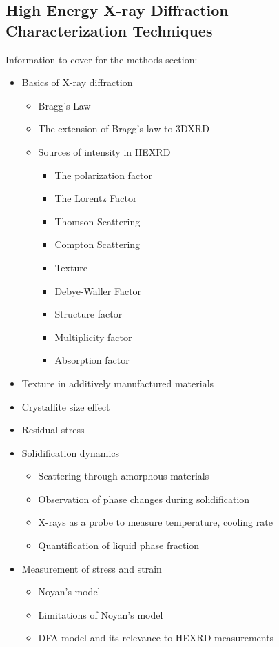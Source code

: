 \subsection{High Energy X-ray Diffraction Characterization Techniques}
Information to cover for the methods section:
\begin{itemize}
	\item Basics of X-ray diffraction \begin{itemize}
		\item Bragg's Law
		\item The extension of Bragg's law to 3DXRD
		\item Sources of intensity in HEXRD \begin{itemize}
			\item The polarization factor
			\item The Lorentz Factor
			\item Thomson Scattering
			\item Compton Scattering
			\item Texture
			\item Debye-Waller Factor
			\item Structure factor
			\item Multiplicity factor
			\item Absorption factor \end{itemize}
		\end{itemize}
	\item Texture in additively manufactured materials
	\item Crystallite size effect
	\item Residual stress
	\item Solidification dynamics \begin{itemize}
		\item Scattering through amorphous materials
		\item Observation of phase changes during solidification
		\item X-rays as a probe to measure temperature, cooling rate
		\item Quantification of liquid phase fraction \end{itemize}
	\item Measurement of stress and strain \begin{itemize}
		\item Noyan's model
		\item Limitations of Noyan's model 
		\item DFA model and its relevance to HEXRD measurements
		\end{itemize}
\end{itemize}

